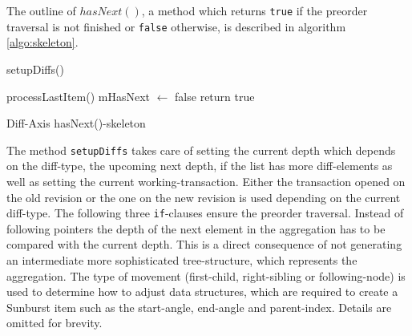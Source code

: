 The outline of $hasNext()$, a method which returns \texttt{true} if the preorder traversal is not finished or \texttt{false} otherwise, is described in algorithm \ref{algo:skeleton}.

\begin{algorithm}[tb]
{}
\BlankLine
{}

setupDiffs()\;

processLastItem()\;
mHasNext $\leftarrow$ false\;
return true\;
\caption{Diff-Axis hasNext()-skeleton}\label{algo:skeleton}
\end{algorithm}

The method \texttt{setupDiffs} takes care of setting the current depth which depends on the diff-type, the upcoming next depth, if the list has more diff-elements as well as setting the current working-transaction. Either the transaction opened on the old revision or the one on the new revision is used depending on the current diff-type. The following three \texttt{if}-clauses ensure the preorder traversal. Instead of following pointers the depth of the next element in the aggregation has to be compared with the current depth. This is a direct consequence of not generating an intermediate more sophisticated tree-structure, which represents the aggregation. The type of movement (first-child, right-sibling or following-node) is used to determine how to adjust data structures, which are required to create a Sunburst item such as the start-angle, end-angle and parent-index. Details are omitted for brevity. 

